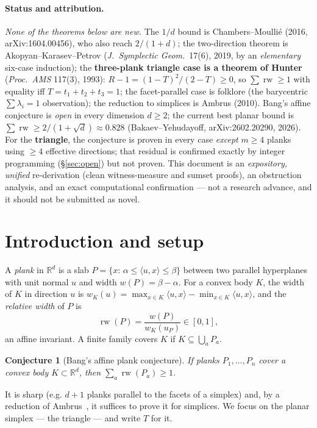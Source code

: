 \documentclass[11pt]{article}
\theoremstyle{plain}
\newtheorem{conjecture}{Conjecture}
\theoremstyle{remark}
\newcommand{\rw}{\operatorname{rw}}
\newcommand{\R}{\mathbb{R}}
\begin{document}
\paragraph{Status and attribution.}
\emph{None of the theorems below are new.} The $1/d$ bound is Chambers--Moulli\'e
(2016, arXiv:1604.00456), who also reach $2/(1+d)$; the two-direction theorem is
Akopyan--Karasev--Petrov (\emph{J.\ Symplectic Geom.}\ 17(6), 2019, by an
\emph{elementary} six-case induction); the \textbf{three-plank triangle case is a
theorem of Hunter} (\emph{Proc.\ AMS} 117(3), 1993): $R-1=(1-T)^2/(2-T)\ge0$, so
$\sum\rw\ge1$ with equality iff $T=t_1+t_2+t_3=1$; the facet-parallel case is
folklore (the barycentric $\sum\lambda_i=1$ observation); the reduction to
simplices is Ambrus (2010). Bang's affine conjecture is \emph{open} in every
dimension $d\ge2$; the current best planar bound is $\sum\rw\ge 2/(1+\sqrt
d)\approx 0.828$ (Bakaev--Yehudayoff, arXiv:2602.20290, 2026). For the
\textbf{triangle}, the conjecture is proven in every case \emph{except} $m\ge4$
planks using $\ge4$ effective directions; that residual is confirmed exactly by
integer programming (\S\ref{sec:open}) but not proven. This document is an
\emph{expository, unified} re-derivation (clean witness-measure and sumset proofs),
an obstruction analysis, and an exact computational confirmation --- not a research
advance, and it should not be submitted as novel.

\section{Introduction and setup}

A \emph{plank} in $\R^d$ is a slab $P=\{x:\,\alpha\le\langle u,x\rangle\le\beta\}$
between two parallel hyperplanes with unit normal $u$ and width
$w(P)=\beta-\alpha$. For a convex body $K$, the width of $K$ in direction $u$ is
$w_K(u)=\max_{x\in K}\langle u,x\rangle-\min_{x\in K}\langle u,x\rangle$, and the
\emph{relative width} of $P$ is
\[
   \rw(P)=\frac{w(P)}{w_K(u_P)}\in[0,1],
\]
an affine invariant. A finite family covers $K$ if $K\subseteq\bigcup_a P_a$.

\begin{conjecture}[Bang's affine plank conjecture]
If planks $P_1,\dots,P_n$ cover a convex body $K\subset\R^d$, then
$\sum_a \rw(P_a)\ge 1$.
\end{conjecture}

It is sharp (e.g. $d{+}1$ planks parallel to the facets of a simplex) and, by a
reduction of Ambrus~\cite{ambrus2010}, it suffices to prove it for simplices. We
focus on the planar simplex --- the triangle --- and write $T$ for it.
\end{document}
